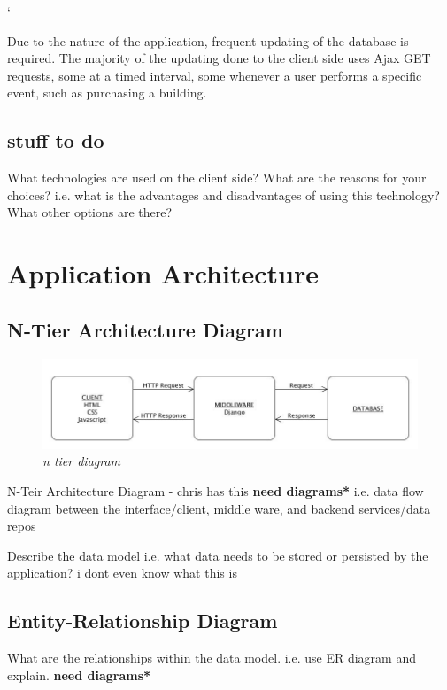`\documentclass{sig-alt-release2}
\begin{document}
Due to the nature of the application, frequent updating of the database is required. The majority of the updating done to the client side uses Ajax GET requests, some at a timed interval, some whenever a user performs a specific event, such as purchasing a building.

\subsection{stuff to do} 

What technologies are used on the client side? 
What are the reasons for your choices? i.e. what is the advantages and disadvantages of using this technology? 
What other options are there? 

\section{Application Architecture}

\subsection{N-Tier Architecture Diagram}

\begin{figure}[!htbp]
  \caption{\textit{n tier diagram}}
  \begin{center}
		\includegraphics[scale=0.28]{img/NTIER.jpg}
  \end{center}
\end{figure}

N-Teir Architecture Diagram - chris has this {\bf *need diagrams*} 
i.e. data flow diagram between the interface/client, middle ware, and backend services/data repos

Describe the data model i.e. what data needs to be stored or persisted by the application? i dont even know what this is

\subsection{Entity-Relationship Diagram}

What are the relationships within the data model.
i.e. use ER diagram and explain. {\bf *need diagrams*} 
\end{document}
